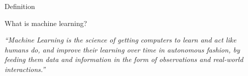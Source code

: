 \documentclass[11pt]{beamer}
\begin{document}
\begin{frame}{
	\begin{minipage}[t]{0.55\textwidth}
		Definition
	\end{minipage}
	\hfill
	\begin{minipage}[t]{0.35\textwidth}
		\flushright
	\end{minipage}
}{}
What is machine learning?

\begin{center}
	\textit{“Machine Learning is the science of getting computers to learn and act like humans do, and improve their learning over time in autonomous fashion, by feeding them data and information in the form of observations and real-world interactions.”}\cite{ml2018}
\end{center}

\end{frame}
\usebackgroundtemplate{}
\end{document}

